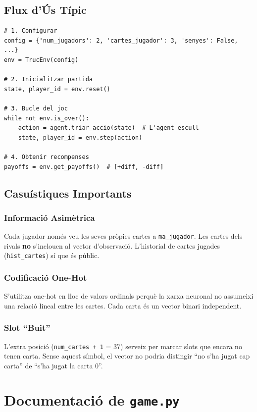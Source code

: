 \documentclass[a4paper,11pt]{report}
\begin{document}
\hrulefill

\section{Flux d'Ús Típic}

\begin{lstlisting}
# 1. Configurar
config = {'num_jugadors': 2, 'cartes_jugador': 3, 'senyes': False, ...}
env = TrucEnv(config)

# 2. Inicialitzar partida
state, player_id = env.reset()

# 3. Bucle del joc
while not env.is_over():
    action = agent.triar_accio(state)  # L'agent escull
    state, player_id = env.step(action)

# 4. Obtenir recompenses
payoffs = env.get_payoffs()  # [+diff, -diff]
\end{lstlisting}

\hrulefill

\section{Casuístiques Importants}

\subsection{Informació Asimètrica}
Cada jugador només veu les seves pròpies cartes a \texttt{ma\_jugador}. Les cartes dels rivals \textbf{no} s'inclouen al vector d'observació. L'historial de cartes jugades (\texttt{hist\_cartes}) sí que és públic.

\subsection{Codificació One-Hot}
S'utilitza one-hot en lloc de valors ordinals perquè la xarxa neuronal no assumeixi una relació lineal entre les cartes. Cada carta és un vector binari independent.

\subsection{Slot ``Buit''}
L'extra posició (\texttt{num\_cartes + 1} = 37) serveix per marcar slots que encara no tenen carta. Sense aquest símbol, el vector no podria distingir ``no s'ha jugat cap carta'' de ``s'ha jugat la carta 0''.


\chapter{Documentació de \texttt{game.py}}
\end{document}
